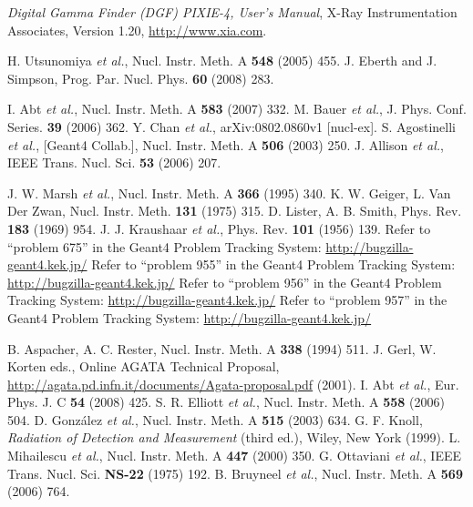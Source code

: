 \begin{thebibliography}{99}
\textit{Digital Gamma Finder (DGF) PIXIE-4, User's Manual}, X-Ray Instrumentation Associates, Version 1.20, \url{http://www.xia.com}.%

H. Utsunomiya \textit{et al.}, Nucl. Instr. Meth. A \textbf{548} (2005) 455.
J. Eberth and J. Simpson, Prog. Par. Nucl. Phys. \textbf{60} (2008) 283.

I. Abt \textit{et al.}, Nucl. Instr. Meth. A \textbf{583} (2007) 332.
M. Bauer \textit{et al.}, J. Phys. Conf. Series. \textbf{39} (2006) 362.
Y. Chan \textit{et al.}, arXiv:0802.0860v1 [nucl-ex].
S. Agostinelli \textit{et al.}, [Geant4 Collab.], Nucl. Instr. Meth. A \textbf{506} (2003) 250.
J. Allison \textit{et al.}, IEEE Trans. Nucl. Sci. \textbf{53} (2006) 207.

J. W. Marsh \textit{et al.}, Nucl. Instr. Meth. A \textbf{366} (1995) 340.
K. W. Geiger, L. Van Der Zwan, Nucl. Instr. Meth. \textbf{131} (1975) 315.
D. Lister, A. B. Smith, Phys. Rev. \textbf{183} (1969)   954.
J. J. Kraushaar \textit{et al.}, Phys. Rev. \textbf{101} (1956) 139.
Refer to ``problem 675'' in the Geant4 Problem Tracking System: \url{http://bugzilla-geant4.kek.jp/}
Refer to ``problem 955'' in the Geant4 Problem Tracking System: \url{http://bugzilla-geant4.kek.jp/}
Refer to ``problem 956'' in the Geant4 Problem Tracking System: \url{http://bugzilla-geant4.kek.jp/}
Refer to ``problem 957'' in the Geant4 Problem Tracking System: \url{http://bugzilla-geant4.kek.jp/}

B. Aspacher, A. C. Rester, Nucl. Instr. Meth. A \textbf{338} (1994) 511.
J. Gerl, W. Korten eds., Online AGATA Technical Proposal, \url{http://agata.pd.infn.it/documents/Agata-proposal.pdf} (2001).
I. Abt \textit{et al.}, Eur. Phys. J. C \textbf{54} (2008) 425.
S. R. Elliott \textit{et al.}, Nucl. Instr. Meth. A \textbf{558} (2006) 504.
D. Gonz\'alez \textit{et al.}, Nucl. Instr. Meth. A \textbf{515} (2003) 634.
G. F. Knoll, \textit{Radiation of Detection and Measurement} (third ed.), Wiley, New York (1999).
L. Mihailescu \textit{et al.}, Nucl. Instr. Meth. A \textbf{447} (2000) 350.
G. Ottaviani \textit{et al.}, IEEE Trans. Nucl. Sci. \textbf{NS-22} (1975) 192.
B. Bruyneel \textit{et al.}, Nucl. Instr. Meth. A \textbf{569} (2006) 764.%

\end{thebibliography}


